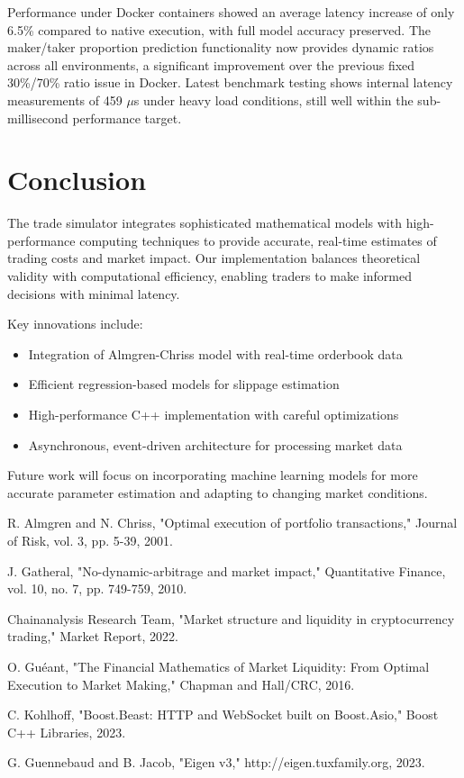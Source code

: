 \documentclass[10pt,twocolumn,a4paper]{IEEEtran}
\begin{document}
Performance under Docker containers showed an average latency increase of only 6.5\% compared to native execution, with full model accuracy preserved. The maker/taker proportion prediction functionality now provides dynamic ratios across all environments, a significant improvement over the previous fixed 30\%/70\% ratio issue in Docker. Latest benchmark testing shows internal latency measurements of 459 $\mu$s under heavy load conditions, still well within the sub-millisecond performance target.

\section{Conclusion}

The trade simulator integrates sophisticated mathematical models with high-performance computing techniques to provide accurate, real-time estimates of trading costs and market impact. Our implementation balances theoretical validity with computational efficiency, enabling traders to make informed decisions with minimal latency.

Key innovations include:

\begin{itemize}
    \item Integration of Almgren-Chriss model with real-time orderbook data
    \item Efficient regression-based models for slippage estimation
    \item High-performance C++ implementation with careful optimizations
    \item Asynchronous, event-driven architecture for processing market data
\end{itemize}

Future work will focus on incorporating machine learning models for more accurate parameter estimation and adapting to changing market conditions.

\begin{thebibliography}{9}

 R. Almgren and N. Chriss, "Optimal execution of portfolio transactions," Journal of Risk, vol. 3, pp. 5-39, 2001.

 J. Gatheral, "No-dynamic-arbitrage and market impact," Quantitative Finance, vol. 10, no. 7, pp. 749-759, 2010.

 Chainanalysis Research Team, "Market structure and liquidity in cryptocurrency trading," Market Report, 2022.

 O. Guéant, "The Financial Mathematics of Market Liquidity: From Optimal Execution to Market Making," Chapman and Hall/CRC, 2016.

 C. Kohlhoff, "Boost.Beast: HTTP and WebSocket built on Boost.Asio," Boost C++ Libraries, 2023.

 G. Guennebaud and B. Jacob, "Eigen v3," http://eigen.tuxfamily.org, 2023.

\end{thebibliography}
\end{document}
